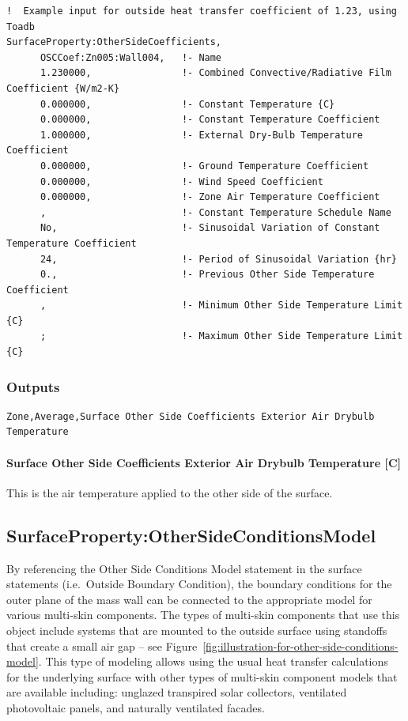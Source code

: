 \begin{lstlisting}
!  Example input for outside heat transfer coefficient of 1.23, using Toadb
SurfaceProperty:OtherSideCoefficients,
      OSCCoef:Zn005:Wall004,   !- Name
      1.230000,                !- Combined Convective/Radiative Film Coefficient {W/m2-K}
      0.000000,                !- Constant Temperature {C}
      0.000000,                !- Constant Temperature Coefficient
      1.000000,                !- External Dry-Bulb Temperature Coefficient
      0.000000,                !- Ground Temperature Coefficient
      0.000000,                !- Wind Speed Coefficient
      0.000000,                !- Zone Air Temperature Coefficient
      ,                        !- Constant Temperature Schedule Name
      No,                      !- Sinusoidal Variation of Constant Temperature Coefficient
      24,                      !- Period of Sinusoidal Variation {hr}
      0.,                      !- Previous Other Side Temperature Coefficient
      ,                        !- Minimum Other Side Temperature Limit {C}
      ;                        !- Maximum Other Side Temperature Limit {C}
\end{lstlisting}

\subsubsection{Outputs}

\begin{lstlisting}
Zone,Average,Surface Other Side Coefficients Exterior Air Drybulb Temperature
\end{lstlisting}

\paragraph{Surface Other Side Coefficients Exterior Air Drybulb Temperature {[}C{]}}\label{surface-other-side-coefficients-exterior-air-drybulb-temperature-c}

This is the air temperature applied to the other side of the surface.

\subsection{SurfaceProperty:OtherSideConditionsModel}\label{surfacepropertyothersideconditionsmodel}

By referencing the Other Side Conditions Model statement in the surface statements (i.e.~Outside Boundary Condition), the boundary conditions for the outer plane of the mass wall can be connected to the appropriate model for various multi-skin components. The types of multi-skin components that use this object include systems that are mounted to the outside surface using standoffs that create a small air gap -- see Figure~\ref{fig:illustration-for-other-side-conditions-model}. This type of modeling allows using the usual heat transfer calculations for the underlying surface with other types of multi-skin component models that are available including: unglazed transpired solar collectors, ventilated photovoltaic panels, and naturally ventilated facades.

